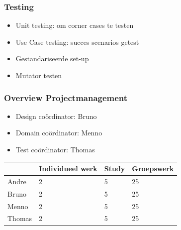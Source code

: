 \documentclass{beamer}
\begin{document}
\begin{frame}
\frametitle {Testing}
\begin{itemize}
    \item Unit testing: om corner cases te testen
    \item Use Case testing: succes scenarios getest
    \item Gestandariseerde set-up
    \item Mutator testen
\end{itemize}

\end{frame}

\begin{frame}
\frametitle{Overview Projectmanagement}


\begin{itemize}
    \item Design co\"ordinator: Bruno
    \item Domain co\"ordinator: Menno
    \item Test co\"ordinator: Thomas
\end{itemize}


\begin{table}[h]
\begin{tabular}{|l|l|l|l|}
\hline
       & Individueel werk & Study & Groepswerk \\ \hline
Andre  &     2             &    5   &   25         \\ \hline
Bruno  &      2            &   5    &   25        \\ \hline
Menno  &          2        &    5  &     25     \\ \hline
Thomas &            2      &     5  &     25    \\ \hline
\end{tabular}
\end{table}

\end{frame}
\end{document}
